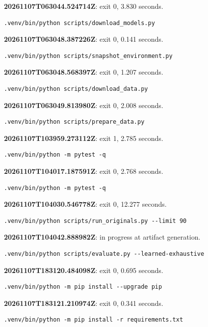 \noindent\textbf{20261107T063044.524714Z}: exit 0, 3.830 seconds.
\begin{lstlisting}[numbers=none]
.venv/bin/python scripts/download_models.py
\end{lstlisting}

\noindent\textbf{20261107T063048.387226Z}: exit 0, 0.141 seconds.
\begin{lstlisting}[numbers=none]
.venv/bin/python scripts/snapshot_environment.py
\end{lstlisting}

\noindent\textbf{20261107T063048.568397Z}: exit 0, 1.207 seconds.
\begin{lstlisting}[numbers=none]
.venv/bin/python scripts/download_data.py
\end{lstlisting}

\noindent\textbf{20261107T063049.813980Z}: exit 0, 2.008 seconds.
\begin{lstlisting}[numbers=none]
.venv/bin/python scripts/prepare_data.py
\end{lstlisting}

\noindent\textbf{20261107T103959.273112Z}: exit 1, 2.785 seconds.
\begin{lstlisting}[numbers=none]
.venv/bin/python -m pytest -q
\end{lstlisting}

\noindent\textbf{20261107T104017.187591Z}: exit 0, 2.768 seconds.
\begin{lstlisting}[numbers=none]
.venv/bin/python -m pytest -q
\end{lstlisting}

\noindent\textbf{20261107T104030.546778Z}: exit 0, 12.277 seconds.
\begin{lstlisting}[numbers=none]
.venv/bin/python scripts/run_originals.py --limit 90
\end{lstlisting}

\noindent\textbf{20261107T104042.888982Z}: in progress at artifact generation.
\begin{lstlisting}[numbers=none]
.venv/bin/python scripts/evaluate.py --learned-exhaustive
\end{lstlisting}

\noindent\textbf{20261107T183120.484098Z}: exit 0, 0.695 seconds.
\begin{lstlisting}[numbers=none]
.venv/bin/python -m pip install --upgrade pip
\end{lstlisting}

\noindent\textbf{20261107T183121.210974Z}: exit 0, 0.341 seconds.
\begin{lstlisting}[numbers=none]
.venv/bin/python -m pip install -r requirements.txt
\end{lstlisting}

